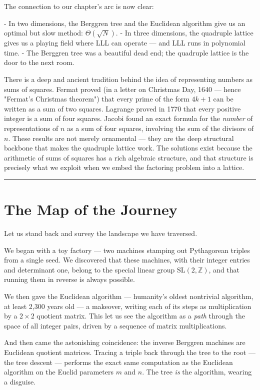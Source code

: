 \documentclass[12pt, letterpaper, openany]{book}
\theoremstyle{definition}
\theoremstyle{remark}
\begin{document}
The connection to our chapter's arc is now clear:

- In two dimensions, the Berggren tree and the Euclidean algorithm give us an optimal but slow method: $\Theta(\sqrt{N})$.
- In three dimensions, the quadruple lattice gives us a playing field where LLL can operate --- and LLL runs in polynomial time.
- The Berggren tree was a beautiful dead end; the quadruple lattice is the door to the next room.

There is a deep and ancient tradition behind the idea of representing numbers as sums of squares. Fermat proved (in a letter on Christmas Day, 1640 --- hence "Fermat's Christmas theorem") that every prime of the form $4k + 1$ can be written as a sum of two squares. Lagrange proved in 1770 that every positive integer is a sum of four squares. Jacobi found an exact formula for the \textit{number} of representations of $n$ as a sum of four squares, involving the sum of the divisors of $n$. These results are not merely ornamental --- they are the deep structural backbone that makes the quadruple lattice work. The solutions exist because the arithmetic of sums of squares has a rich algebraic structure, and that structure is precisely what we exploit when we embed the factoring problem into a lattice.


\bigskip\noindent\rule{\textwidth}{0.4pt}\bigskip



\section*{The Map of the Journey}


Let us stand back and survey the landscape we have traversed.

We began with a toy factory --- two machines stamping out Pythagorean triples from a single seed. We discovered that these machines, with their integer entries and determinant one, belong to the special linear group $\mathrm{SL}(2, \mathbb{Z})$, and that running them in reverse is always possible.

We then gave the Euclidean algorithm --- humanity's oldest nontrivial algorithm, at least 2,300 years old --- a makeover, writing each of its steps as multiplication by a $2 \times 2$ quotient matrix. This let us see the algorithm as a \textit{path} through the space of all integer pairs, driven by a sequence of matrix multiplications.

And then came the astonishing coincidence: the inverse Berggren machines are Euclidean quotient matrices. Tracing a triple back through the tree to the root --- the tree descent --- performs the exact same computation as the Euclidean algorithm on the Euclid parameters $m$ and $n$. The tree \textit{is} the algorithm, wearing a disguise.
\end{document}
